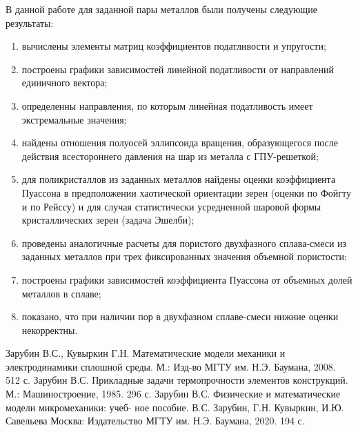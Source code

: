\documentclass[12pt, a4paper]{article}
\begin{document}
В данной работе для заданной пары металлов были получены следующие результаты:
\begin{enumerate}
\item вычислены элементы матриц коэффициентов податливости и упругости;
\item построены графики зависимостей линейной податливости от направлений единичного вектора;
\item определенны направления, по которым линейная податливость имеет экстремальные значения;
\item найдены отношения полуосей эллипсоида вращения, образующегося после действия всестороннего давления на шар из металла с ГПУ-решеткой;
\item для поликристаллов из заданных металлов найдены оценки коэффициента
Пуассона в предположении хаотической ориентации зерен (оценки по Фойгту и по Рейссу) и для случая статистически усредненной шаровой формы кристаллических зерен (задача Эшелби);
\item проведены аналогичные расчеты для пористого двухфазного сплава-смеси из заданных металлов при трех фиксированных значения объемной пористости;
\item построены графики зависимостей коэффициента Пуассона от объемных долей металлов в сплаве;
\item показано, что при наличии пор в двухфазном сплаве-смеси нижние оценки некорректны.

\end{enumerate}

\newpage
\begin{thebibliography}{2}
 Зарубин В.С., Кувыркин Г.Н. Математические модели механики и электродинамики сплошной среды. М.: Изд-во МГТУ им. Н.Э. Баумана, 2008. 512 с.
 Зарубин В.С. Прикладные задачи термопрочности элементов конструкций. М.: Машиностроение, 1985. 296 с.
 Зарубин В.С. Физические и математические модели микромеханики: учеб-
ное пособие. В.С. Зарубин, Г.Н. Кувыркин, И.Ю. Савельева Москва: Издательство МГТУ им. Н.Э. Баумана, 2020. 194 с.

\end{thebibliography}
\end{document}
